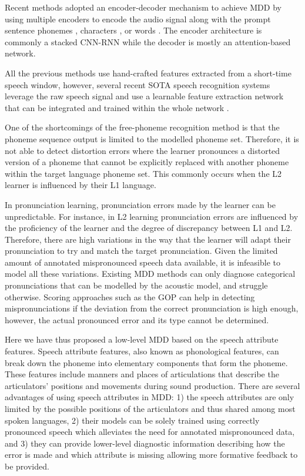 \documentclass[12pt]{elsarticle}
\begin{document}
Recent methods adopted an encoder-decoder mechanism to achieve MDD by using multiple encoders to encode the audio signal \cite{RN136} along with the prompt sentence phonemes \cite{RN132, RN32}, characters \cite{RN31}, or words \cite{RN135}. The encoder architecture is commonly a stacked CNN-RNN \cite{RN31, RN32} while the decoder is mostly an attention-based network.

All the previous methods use hand-crafted features extracted from a short-time speech window, however, several recent SOTA speech recognition systems leverage the raw speech signal and use a learnable feature extraction network that can be integrated and trained within the whole network \cite{RN138, RN139, RN140}.

One of the shortcomings of the free-phoneme recognition method is that the phoneme sequence output is limited to the modelled phoneme set. Therefore, it is not able to detect distortion errors where the learner pronounces a distorted version of a phoneme that cannot be explicitly replaced with another phoneme within the target language phoneme set. This commonly occurs when the L2 learner is influenced by their L1 language.

In pronunciation learning, pronunciation errors made by the learner can be unpredictable. For instance, in L2 learning pronunciation errors are influenced by the proficiency of the learner and the degree of discrepancy between L1 and L2. Therefore, there are high variations in the way that the learner will adapt their pronunciation to try and match the target pronunciation. Given the limited amount of annotated mispronounced speech data available, it is infeasible to model all these variations.
Existing MDD methods can only diagnose categorical pronunciations that can be modelled by the acoustic model, and struggle otherwise. Scoring approaches such as the GOP can help in detecting mispronunciations if the deviation from the correct pronunciation is high enough, however, the actual pronounced error and its type cannot be determined.

Here we have thus proposed a low-level MDD based on the speech attribute features. Speech attribute features, also known as phonological features, can break down the phoneme into elementary components that form the phoneme. These features include manners and places of articulations that describe the articulators’ positions and movements during sound production. There are several advantages of using speech attributes in MDD: 1) the speech attributes are only limited by the possible positions of the articulators and thus shared among most spoken languages, 2) their models can be solely trained using correctly pronounced speech which alleviates the need for annotated mispronounced data, and 3) they can provide lower-level diagnostic information describing how the error is made and which attribute is missing allowing more formative feedback to be provided.
\end{document}
